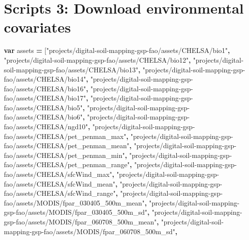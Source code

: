 \documentclass[
  10pt,
  b5paper,
  oneside]{book}
\newenvironment{Shaded}{\begin{snugshade}}{\end{snugshade}}
\newcommand{\KeywordTok}[1]{\textcolor[rgb]{0.13,0.29,0.53}{\textbf{#1}}}
\newcommand{\NormalTok}[1]{#1}
\newcommand{\OperatorTok}[1]{\textcolor[rgb]{0.81,0.36,0.00}{\textbf{#1}}}
\newcommand{\StringTok}[1]{\textcolor[rgb]{0.31,0.60,0.02}{#1}}
\begin{document}
\hypertarget{scripts-3-download-environmental-covariates}{%
\section*{Scripts 3: Download environmental covariates}\label{scripts-3-download-environmental-covariates}}

\begin{Shaded}
\begin{Highlighting}[]
\KeywordTok{var}\NormalTok{ assets }\OperatorTok{=} 
\NormalTok{[}\StringTok{"projects/digital{-}soil{-}mapping{-}gsp{-}fao/assets/CHELSA/bio1"}\OperatorTok{,}
\StringTok{"projects/digital{-}soil{-}mapping{-}gsp{-}fao/assets/CHELSA/bio12"}\OperatorTok{,}
\StringTok{"projects/digital{-}soil{-}mapping{-}gsp{-}fao/assets/CHELSA/bio13"}\OperatorTok{,}
\StringTok{"projects/digital{-}soil{-}mapping{-}gsp{-}fao/assets/CHELSA/bio14"}\OperatorTok{,}
\StringTok{"projects/digital{-}soil{-}mapping{-}gsp{-}fao/assets/CHELSA/bio16"}\OperatorTok{,}
\StringTok{"projects/digital{-}soil{-}mapping{-}gsp{-}fao/assets/CHELSA/bio17"}\OperatorTok{,}
\StringTok{"projects/digital{-}soil{-}mapping{-}gsp{-}fao/assets/CHELSA/bio5"}\OperatorTok{,}
\StringTok{"projects/digital{-}soil{-}mapping{-}gsp{-}fao/assets/CHELSA/bio6"}\OperatorTok{,}
\StringTok{"projects/digital{-}soil{-}mapping{-}gsp{-}fao/assets/CHELSA/ngd10"}\OperatorTok{,}
\StringTok{"projects/digital{-}soil{-}mapping{-}gsp{-}fao/assets/CHELSA/pet\_penman\_max"}\OperatorTok{,}
\StringTok{"projects/digital{-}soil{-}mapping{-}gsp{-}fao/assets/CHELSA/pet\_penman\_mean"}\OperatorTok{,}
\StringTok{"projects/digital{-}soil{-}mapping{-}gsp{-}fao/assets/CHELSA/pet\_penman\_min"}\OperatorTok{,}
\StringTok{"projects/digital{-}soil{-}mapping{-}gsp{-}fao/assets/CHELSA/pet\_penman\_range"}\OperatorTok{,}
\StringTok{"projects/digital{-}soil{-}mapping{-}gsp{-}fao/assets/CHELSA/sfcWind\_max"}\OperatorTok{,}
\StringTok{"projects/digital{-}soil{-}mapping{-}gsp{-}fao/assets/CHELSA/sfcWind\_mean"}\OperatorTok{,}
\StringTok{"projects/digital{-}soil{-}mapping{-}gsp{-}fao/assets/CHELSA/sfcWind\_range"}\OperatorTok{,}
\StringTok{"projects/digital{-}soil{-}mapping{-}gsp{-}fao/assets/MODIS/fpar\_030405\_500m\_mean"}\OperatorTok{,}
\StringTok{"projects/digital{-}soil{-}mapping{-}gsp{-}fao/assets/MODIS/fpar\_030405\_500m\_sd"}\OperatorTok{,}
\StringTok{"projects/digital{-}soil{-}mapping{-}gsp{-}fao/assets/MODIS/fpar\_060708\_500m\_mean"}\OperatorTok{,}
\StringTok{"projects/digital{-}soil{-}mapping{-}gsp{-}fao/assets/MODIS/fpar\_060708\_500m\_sd"}\OperatorTok{,}

\end{Highlighting}
\end{Shaded}
\end{document}
